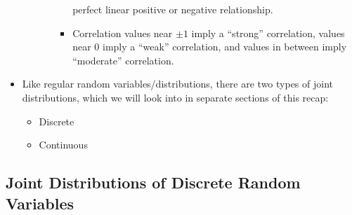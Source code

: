 \documentclass[12pt]{article}
\begin{document}
\begin{itemize}
\begin{itemize}
\begin{itemize}
\begin{itemize}
				                        perfect linear positive or negative
				                        relationship.
				                  \item Correlation values near $\pm 1$
				                        imply a ``strong'' correlation, values near $0$ imply a
				                        ``weak'' correlation, and values in between imply
				                        ``moderate'' correlation.
			                  \end{itemize}
		            \end{itemize}
	      \end{itemize}
	\item Like regular random variables/distributions, there are two types of
	      joint distributions, which we will look into in separate sections of
	      this recap:
	      \begin{itemize}
		      \item Discrete
		      \item Continuous
	      \end{itemize}
\end{itemize}

\subsection{Joint Distributions of Discrete Random Variables}
\end{document}
